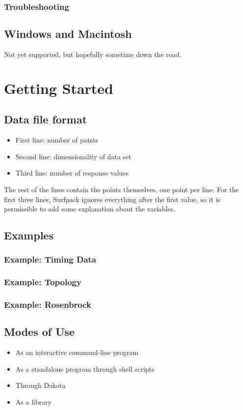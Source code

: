 \documentclass{article}
\begin{document}
\subsubsection{Troubleshooting}
\subsection{Windows and Macintosh}
Not yet supported, but hopefully sometime down the road.

\section{Getting Started}
\subsection{Data file format}\label{sec:format}


\begin{itemize}
\item First line: number of points
\item Second line: dimensionality of data set
\item Third line: number of response values
\end{itemize}

The rest of the lines contain the points themselves, one point per
line.  For the first three lines, Surfpack ignores everything after
the first value, so it is permissible to add some explanation about
the variables.



\subsection{\textup{Examples}}\label{sec:example}


\subsubsection{Example: Timing Data}
\subsubsection{Example: Topology }
\subsubsection{Example: Rosenbrock}

\subsection{Modes of Use}
\begin{itemize}
\item As an interactive command-line program
\item As a standalone program through shell scripts
\item Through Dakota
\item As a library
\end{itemize}
\end{document}
